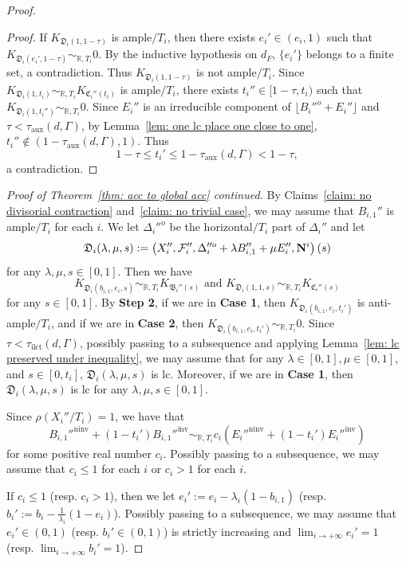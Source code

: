 \documentclass[11pt,reqno]{amsart}
\numberwithin{equation}{section}
\newcommand{\Nn}{{\bf{N}}}
\newcommand{\Dd}{{\mathfrak{D}}}
\newcommand{\Cc}{\mathfrak{C}}
\newcommand{\ninv}{\operatorname{ninv}}
\newcommand{\inv}{\operatorname{inv}}
\newcommand{\ilct}{\operatorname{ilct}}
\newcommand{\aux}{\operatorname{aux}}
\newcommand{\Bb}{{\mathfrak{B}}}
\newcommand{\Ff}{\mathcal{F}}
\newcommand{\Ii}{\Gamma}
\theoremstyle{definition}
\begin{document}
\begin{proof}
\begin{proof}
If $K_{\Dd_i(1,1-\tau)}$ is ample$/T_i$, then there exists $e_i'\in (e_i,1)$ such that $K_{\Dd_i(e_i',1-\tau)}\sim_{\mathbb R,T_i}0$. By the inductive hypothesis on $d_F$, $\{e_i'\}$ belongs to a finite set, a contradiction. Thus $K_{\Dd_i(1,1-\tau)}$ is not ample$/T_i$. Since $K_{\Dd_i(1,t_i)}\sim_{\mathbb R,T_i}K_{\Cc_i''(t_i)}$ is ample$/T_i$, there exists $t_i''\in [1-\tau,t_i)$ such that $K_{\Dd_i(1,t_i'')}\sim_{\mathbb R,T_i}0$. Since $E_i''$ is an irreducible component of $\lfloor B_i''^o+E_i''\rfloor$ and $\tau<\tau_{\aux}(d,\Ii)$, by Lemma~\ref{lem: one lc place one close to one}, $t_i''\not\in (1-\tau_{\aux}(d,\Ii),1)$. Thus
$$1-\tau\leq t_i'\leq 1-\tau_{\aux}(d,\Ii)<1-\tau,$$
a contradiction.
\end{proof}
\noindent\textit{Proof of Theorem~\ref{thm: acc to global acc} continued.} By Claims~\ref{claim: no divisorial contraction} and~\ref{claim: no trivial case}, we may assume that $B_{i,1}''$ is ample$/T_i$ for each $i$. We let $\Delta_i''^o$ be the horizontal$/T_i$ part of $\Delta_i''$ and let
$$\Dd_i(\lambda,\mu,s):=\left(X_i'',\Ff_i'',\Delta_i''^o+\lambda B_{i,1}''+\mu E_i'',\Nn^i\right)(s)$$
for any $\lambda,\mu,s\in [0,1]$. Then we have
$$K_{\Dd_i(b_{i,1},e_i,s)}\sim_{\mathbb R,T_i}K_{\Bb_i''(s)}\text{ and }K_{\Dd_i(1,1,s)}\sim_{\mathbb R,T_i}K_{\Cc_i''(s)}$$
for any $s\in [0,1]$. By \textbf{Step 2}, if we are in \textbf{Case 1}, then $K_{\Dd_i(b_{i,1},e_i,t_i')}$ is anti-ample$/T_i$, and if we are in \textbf{Case 2}, then $K_{\Dd_i(b_{i,1},e_i,t_i')}\sim_{\mathbb R,T_i}0$. Since $\tau<\tau_{\ilct}(d,\Ii)$, possibly passing to a subsequence and applying Lemma~\ref{lem: lc preserved under inequality}, we may assume that for any $\lambda\in [0,1],\mu\in [0,1]$, and $s\in [0,t_i]$, $\Dd_i(\lambda,\mu,s)$ is lc. Moreover, if we are in \textbf{Case 1}, then $\Dd_i(\lambda,\mu,s)$ is lc for any $\lambda,\mu,s\in [0,1]$.

Since $\rho(X_i''/T_i)=1$, we have that
$$B_{i,1}''^{\ninv}+(1-t_i')B_{i,1}''^{\inv}\sim_{\mathbb R,T_i}c_i(E_i''^{\ninv}+(1-t_i')E_i''^{\inv})$$
for some positive real number $c_i$. Possibly passing to a subsequence, we may assume that $c_i\leq 1$ for each $i$ or $c_i>1$ for each $i$. 

If $c_i\leq 1$ (resp. $c_i>1$), then we let $e_i':=e_i-\lambda_i(1-b_{i,1})$ (resp. $b_i':=b_i-\frac{1}{\lambda_i}(1-e_i)$). Possibly passing to a subsequence, we may assume that $e_i'\in (0,1)$ (resp. $b_i'\in (0,1)$) is strictly increasing and $\lim_{i\rightarrow+\infty}e_i'=1$ (resp. $\lim_{i\rightarrow+\infty}b_i'=1$). 


\end{proof}
\end{document}
